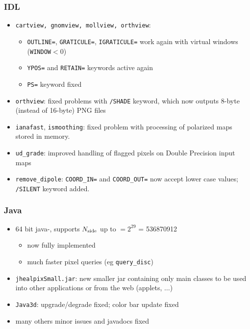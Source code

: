 \documentclass[12pt,twoside]{article}
\newcommand{\nside}{{N_{\rm side}}}
\begin{document}
\subsubsection[IDL]{IDL}
 \begin{itemize}
	\item {\tt cartview, gnomview, mollview, orthview}:
        \begin{itemize}
		\item {\tt OUTLINE=}, {\tt GRATICULE=}, {\tt IGRATICULE=} work
again with virtual windows ({\tt WINDOW}$<0$)
		\item {\tt YPOS=} and {\tt RETAIN=} keywords active again
		\item {\tt PS=} keyword fixed %
	\end{itemize}
	\item {\tt orthview}:
		fixed problems with {\tt /SHADE} keyword, which now
outputs 8-byte (instead of 16-byte) PNG files
	\item {\tt ianafast}, {\tt ismoothing}: fixed problem with processing of
polarized maps stored in memory.
	\item {\tt ud\_grade}: improved handling of flagged pixels on Double
Precision input maps
	\item {\tt remove\_dipole}: {\tt COORD\_IN=} and {\tt COORD\_OUT=} now
accept lower case values; {\tt /SILENT} keyword added.
 \end{itemize}

%
\subsubsection[Java]{Java}
\begin{itemize}
	\item 64 bit java-\healpix, supports $\nside$ up to $ = 2^{29}$ = 536870912
	\begin{itemize}
		\item now fully implemented
		\item much faster pixel queries (eg {\tt query\_disc})
	\end{itemize}
	\item {\tt jhealpixSmall.jar}: new smaller jar containing only main
classes to be used into other applications or from the web (applets, $\ldots$)
	\item {\tt Java3d}: upgrade/degrade fixed; color bar update fixed
	\item many others minor issues and javadocs fixed
\end{itemize}
\end{document}
